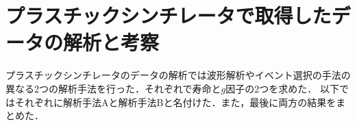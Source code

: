 







%

\section{プラスチックシンチレータで取得したデータの解析と考察}
プラスチックシンチレータのデータの解析では波形解析やイベント選択の手法の異なる2つの解析手法を行った．それぞれで寿命と$g$因子の2つを求めた．
以下ではそれぞれに解析手法Aと解析手法Bと名付けた．また，最後に両方の結果をまとめた．

